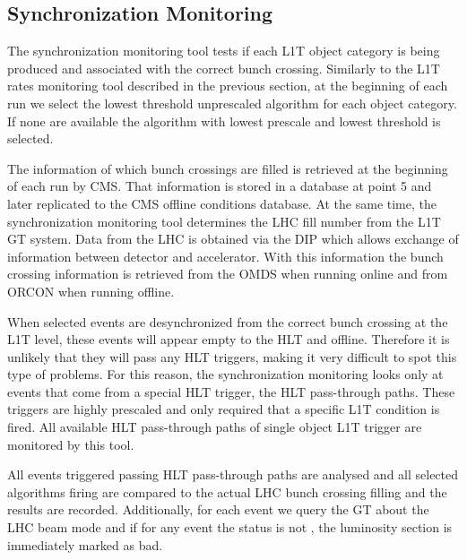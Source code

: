 \subsection{Synchronization Monitoring}
\label{SECTION:TechnicalWork_L1TDQM_SynchronizationMonitoring}


The synchronization monitoring tool tests if each \gls{L1T} object category is being produced and associated with the correct bunch crossing. Similarly to the \gls{L1T} rates monitoring tool described in the previous section, at the beginning of each run we select the lowest threshold unprescaled algorithm for each object category. If none are available the algorithm with lowest prescale and lowest threshold is selected.

The information of which bunch crossings are filled is retrieved at the beginning of each run by \gls{CMS}. That information is stored in a database at point 5 and later replicated to the \gls{CMS} offline conditions database. At the same time, the synchronization monitoring tool determines the \gls{LHC} fill number from the \gls{L1T} \gls{GT} system. Data from the \gls{LHC} is obtained via the \gls{DIP} which allows exchange of information between detector and accelerator. With this information the bunch crossing information is retrieved from the \gls{OMDS} when running online and from \gls{ORCON} when running offline.

When selected events are desynchronized from the correct bunch crossing at the \gls{L1T} level, these events will appear empty to the \gls{HLT} and offline. Therefore it is unlikely that they will pass any \gls{HLT} triggers, making it very difficult to spot this type of problems. For this reason, the synchronization monitoring looks only at events that come from a special \gls{HLT} trigger, the \gls{HLT} pass-through paths. These triggers are highly prescaled and only required that a specific \gls{L1T} condition is fired. All available \gls{HLT} pass-through paths of single object \gls{L1T} trigger are monitored by this tool.

All events triggered passing \gls{HLT} pass-through paths are analysed and all selected algorithms firing are compared to the actual \gls{LHC} bunch crossing filling and the results are recorded. Additionally, for each event we query the \gls{GT} about the \gls{LHC} beam mode and if for any event the status is not , the luminosity section is immediately marked as bad.

